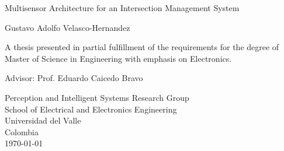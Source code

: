 \begin{titlepage}
    \begin{center}
        \vspace*{1cm}
        \Huge        
        Multisensor Architecture for an Intersection Management System
   
        \vspace{3.5cm}
        \LARGE
        Gustavo Adolfo Velasco-Hernandez
        
        \vfill
        \large
		        
        
        A thesis presented in partial fulfillment of the requirements for the degree of Master of Science in Engineering with emphasis on Electronics.
        
        \vspace{2cm}
        
        Advisor: Prof. Eduardo Caicedo Bravo
		
		\vspace{2cm}
        
        Perception and Intelligent Systems Research Group \\
        School of Electrical and Electronics Engineering\\
        Universidad del Valle\\
        Colombia\\
        \today
        
    \end{center}
\end{titlepage}
